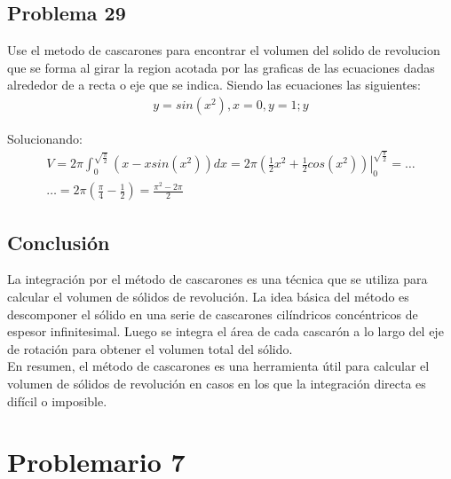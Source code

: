 \documentclass{article}
\begin{document}
\subsection{Problema 29}
Use el metodo de cascarones para encontrar el volumen del solido de revolucion que se forma al girar la region acotada por las graficas de las ecuaciones dadas alrededor de a recta o eje que se indica.
Siendo las ecuaciones las siguientes:
\begin{align*}
  y = sin (x^2) , x = 0, y = 1; y
\end{align*}

\begin{center}
\end{center}

Solucionando:
\begin{align*}
  V = 2\pi\int_{0}^{\sqrt{\frac{\pi}{2}}}(x-xsin(x^2))dx = 2\pi\left.\left(\frac{1}{2}x^2+\frac{1}{2}cos(x^2)\right)\right|_0^{\sqrt{\frac{\pi}{2}}} = \dots \\ \dots = 2\pi\left(\frac{\pi}{4}-\frac{1}{2}\right)=\frac{\pi^2-2\pi}{2}
\end{align*}

\subsection{Conclusión}
La integración por el método de cascarones es una técnica que se utiliza para calcular el volumen de sólidos de revolución. La idea básica del método es descomponer el sólido en una serie de cascarones cilíndricos concéntricos de espesor infinitesimal. Luego se integra el área de cada cascarón a lo largo del eje de rotación para obtener el volumen total del sólido.\\
En resumen, el método de cascarones es una herramienta útil para calcular el volumen de sólidos de revolución en casos en los que la integración directa es difícil o imposible.

\section{Problemario 7 }
\end{document}
